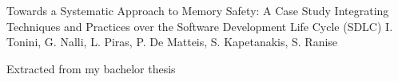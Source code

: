 
\begin{cventries}
  {Towards a Systematic Approach to Memory Safety: A Case Study Integrating Techniques and Practices over the Software Development Life Cycle (SDLC)} %
  {I. Tonini, G. Nalli, L. Piras, P. De Matteis, S. Kapetanakis, S. Ranise} %
  {} %
  { \begin{cvitems} %
  \item {Extracted from my bachelor thesis}\end{cvitems} }
\end{cventries}